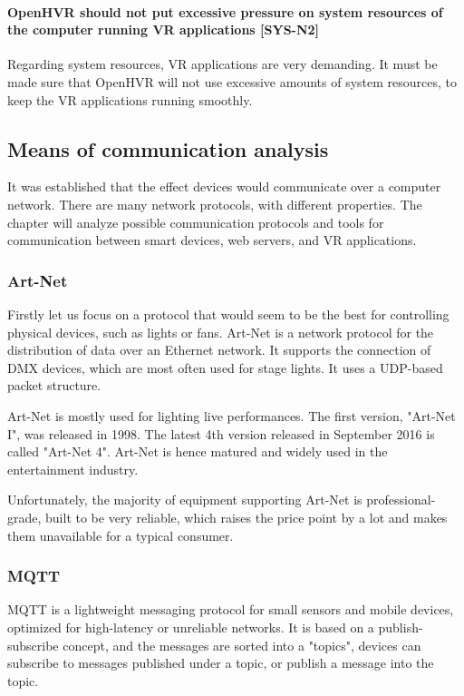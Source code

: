 \hypertarget{x-\textbf{openhvr-should-not-put-excessive-pressure-on-system-resources-of-the-computer-running-vr-applications}-[sys-n2]}{\paragraph*{\textbf{OpenHVR should not put excessive pressure on system resources of the computer running VR applications} [SYS-N2]}}
Regarding system resources, VR applications are very demanding. It must be
made sure that OpenHVR will not use excessive amounts of system resources,
to keep the VR applications running smoothly.


\hypertarget{x-means-of-communication-analysis}{\subsection*{Means of communication analysis}}
It was established that the effect devices would communicate over a computer network.
There are many network protocols, with different properties. The chapter will
analyze possible communication protocols and tools for communication
between smart devices, web servers, and VR applications.


\hypertarget{x-art-net}{\subsubsection*{Art-Net}}
Firstly let us focus on a protocol that would seem to be the best for controlling
physical devices, such as lights or fans. Art-Net is a network protocol for
the distribution of data over an Ethernet network. It supports the connection of DMX
devices, which are most often used for stage lights. It uses a UDP-based packet
structure. \hyperlink{artnet}{}


Art-Net is mostly used for lighting live performances. The first version,
"Art-Net I", was released in 1998. The latest 4th version released
in September 2016
is called "Art-Net 4". Art-Net is hence matured and widely used in the
entertainment industry.


Unfortunately, the majority of equipment supporting Art-Net is
professional-grade, built to be very reliable, which raises the price point
by a lot and makes them unavailable for a typical consumer.


\hypertarget{x-mqtt}{\subsubsection*{MQTT}}
MQTT is a lightweight messaging protocol for small sensors and mobile devices,
optimized for high-latency or unreliable networks. \hyperlink{mqtthp}{} It is
based on a publish-subscribe concept, and the messages are sorted into a "topics",
devices can subscribe to messages published under a topic, or publish
a message into the topic.


